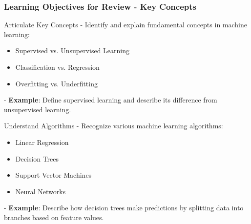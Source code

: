 \documentclass[aspectratio=169]{beamer}
\begin{document}
\begin{frame}[fragile]
    \frametitle{Learning Objectives for Review - Key Concepts}
    \begin{block}{Articulate Key Concepts}
        - Identify and explain fundamental concepts in machine learning:
          \begin{itemize}
              \item Supervised vs. Unsupervised Learning
              \item Classification vs. Regression
              \item Overfitting vs. Underfitting
          \end{itemize}
        - \textbf{Example}: Define supervised learning and describe its difference from unsupervised learning.
    \end{block}

    \begin{block}{Understand Algorithms}
        - Recognize various machine learning algorithms:
          \begin{itemize}
              \item Linear Regression
              \item Decision Trees
              \item Support Vector Machines
              \item Neural Networks
          \end{itemize}
        - \textbf{Example}: Describe how decision trees make predictions by splitting data into branches based on feature values.
    \end{block}
\end{frame}
\end{document}
